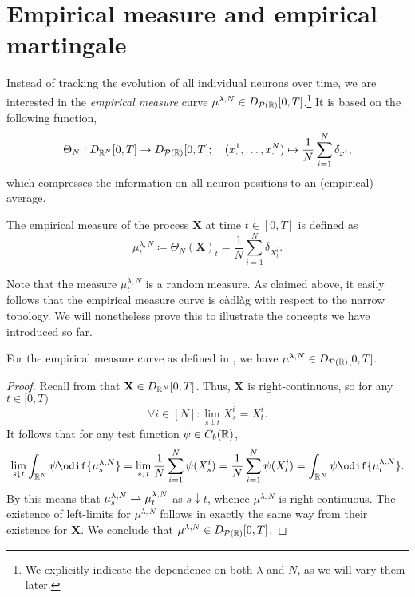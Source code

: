 \section{Empirical measure and empirical martingale}

Instead of tracking the evolution of all individual neurons over time, we are interested in the \textit{empirical measure} curve \(\mu^{\lambda,N} \in D_{\mathcal{P}(\mathbb{R})}[0,T]\).\footnote{We explicitly indicate the dependence on both \(\lambda\) and \(N\), as we will vary them later.}
It is based on the following function,
\begin{equation}
  \Theta_N : D_{\mathbb{R}^N}[0,T] \to D_{\mathcal{P}(\mathbb{R})}[0,T]; \quad (x_\cdot^1,\dots,x_\cdot^N) \mapsto \frac{1}{N} \sum_{i=1}^N \delta_{x_\cdot^i},
\end{equation}
which compresses the information on all neuron positions to an (empirical) average.
\begin{definition}\label{def:emp-measure}
  The empirical measure of the process \(\bm{X}\) at time \(t \in [0,T]\) is defined as
  \begin{equation}
    \mu_t^{\lambda, N} \coloneqq \Theta_N(\bm{X})_t = \frac{1}{N} \sum_{i=1}^N \delta_{X_t^i}.
  \end{equation}
\end{definition}
Note that the measure \(\mu_t^{\lambda, N}\) is a random measure.
As claimed above, it easily follows that the empirical measure curve is càdlàg with respect to the narrow topology.
We will nonetheless prove this to illustrate the concepts we have introduced so far.
\begin{lemma}
  For the empirical measure curve as defined in , we have \(\mu^{\lambda,N} \in D_{\mathcal{P}(\mathbb{R})}[0,T]\).
\end{lemma}

\begin{proof}
  Recall from  that \(\mathbf{X} \in D_{\mathbb{R}^N}[0,T]\).
  Thus, \(\bm{X}\) is right-continuous, so for any \(t \in [0,T)\)
  \begin{equation}
    \forall i \in [N] : \lim_{s \downarrow t} X_s^i = X_t^i.
  \end{equation}
  It follows that for any test function \(\psi \in C_b(\mathbb{R})\),
  \begin{equation}
    \lim_{s \downarrow t} \int_{\potspace^N} \psi \odif{\mu_s^{\lambda, N}}
    = \lim_{s \downarrow t} \frac{1}{N} \sum_{i=1}^N \psi(X_s^i)
    = \frac{1}{N} \sum_{i=1}^N \psi(X_t^i)
    = \int_{\potspace^N} \psi \odif{\mu_t^{\lambda, N}}.
  \end{equation}
  By  this means that \(\mu_s^{\lambda, N} \rightharpoonup \mu_t^{\lambda, N}\) as \(s \downarrow t\), whence \(\mu^{\lambda,N}\) is right-continuous.
  The existence of left-limits for \(\mu^{\lambda,N}\) follows in exactly the same way from their existence for \(\bm{X}\).
  We conclude that \(\mu^{\lambda,N} \in D_{\mathcal{P}(\mathbb{R})}[0,T]\).
\end{proof}

